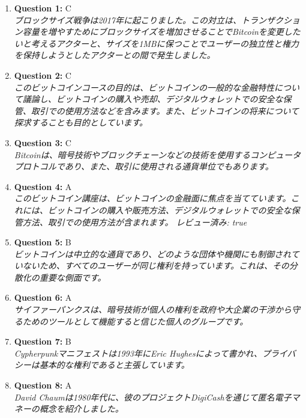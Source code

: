 \documentclass[12pt,a4paper]{article}
\begin{document}
\begin{enumerate}
\item \textbf{Question 1:} C
\\ \textit{ブロックサイズ戦争は2017年に起こりました。この対立は、トランザクション容量を増やすためにブロックサイズを増加させることでBitcoinを変更したいと考えるアクターと、サイズを1MBに保つことでユーザーの独立性と権力を保持しようとしたアクターとの間で発生しました。}

\item \textbf{Question 2:} C
\\ \textit{このビットコインコースの目的は、ビットコインの一般的な金融特性について議論し、ビットコインの購入や売却、デジタルウォレットでの安全な保管、取引での使用方法などを含みます。また、ビットコインの将来について探求することも目的としています。}

\item \textbf{Question 3:} C
\\ \textit{Bitcoinは、暗号技術やブロックチェーンなどの技術を使用するコンピュータプロトコルであり、また、取引に使用される通貨単位でもあります。}

\item \textbf{Question 4:} A
\\ \textit{このビットコイン講座は、ビットコインの金融面に焦点を当てています。これには、ビットコインの購入や販売方法、デジタルウォレットでの安全な保管方法、取引での使用方法が含まれます。
レビュー済み: true}

\item \textbf{Question 5:} B
\\ \textit{ビットコインは中立的な通貨であり、どのような団体や機関にも制御されていないため、すべてのユーザーが同じ権利を持っています。これは、その分散化の重要な側面です。}

\item \textbf{Question 6:} A
\\ \textit{サイファーパンクスは、暗号技術が個人の権利を政府や大企業の干渉から守るためのツールとして機能すると信じた個人のグループです。}

\item \textbf{Question 7:} B
\\ \textit{Cypherpunkマニフェストは1993年にEric Hughesによって書かれ、プライバシーは基本的な権利であると主張しています。}

\item \textbf{Question 8:} A
\\ \textit{David Chaumは1980年代に、彼のプロジェクトDigiCashを通じて匿名電子マネーの概念を紹介しました。}


\end{enumerate}
\end{document}
